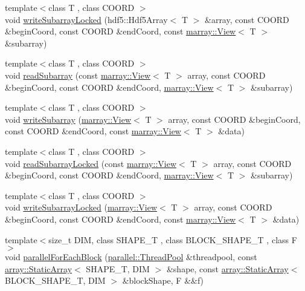 \begin{DoxyCompactItemize}
\item 
{\footnotesize template$<$class T , class C\+O\+O\+RD $>$ }\\void \hyperlink{namespacenifty_1_1tools_a102fca55b5880c5b398205f0b438fbfe}{write\+Subarray\+Locked} (hdf5\+::\+Hdf5\+Array$<$ T $>$ \&array, const C\+O\+O\+RD \&begin\+Coord, const C\+O\+O\+RD \&end\+Coord, const \hyperlink{classandres_1_1View}{marray\+::\+View}$<$ T $>$ \&subarray)
\item 
{\footnotesize template$<$class T , class C\+O\+O\+RD $>$ }\\void \hyperlink{namespacenifty_1_1tools_ab1a49786aa1d421ff8801c6659ada142}{read\+Subarray} (const \hyperlink{classandres_1_1View}{marray\+::\+View}$<$ T $>$ array, const C\+O\+O\+RD \&begin\+Coord, const C\+O\+O\+RD \&end\+Coord, \hyperlink{classandres_1_1View}{marray\+::\+View}$<$ T $>$ \&subarray)
\item 
{\footnotesize template$<$class T , class C\+O\+O\+RD $>$ }\\void \hyperlink{namespacenifty_1_1tools_ace36c8be6273f83864c4b1b261eb25d3}{write\+Subarray} (\hyperlink{classandres_1_1View}{marray\+::\+View}$<$ T $>$ array, const C\+O\+O\+RD \&begin\+Coord, const C\+O\+O\+RD \&end\+Coord, const \hyperlink{classandres_1_1View}{marray\+::\+View}$<$ T $>$ \&data)
\item 
{\footnotesize template$<$class T , class C\+O\+O\+RD $>$ }\\void \hyperlink{namespacenifty_1_1tools_ad9c06ed1bf5a27481583971a28bf9142}{read\+Subarray\+Locked} (const \hyperlink{classandres_1_1View}{marray\+::\+View}$<$ T $>$ array, const C\+O\+O\+RD \&begin\+Coord, const C\+O\+O\+RD \&end\+Coord, \hyperlink{classandres_1_1View}{marray\+::\+View}$<$ T $>$ \&subarray)
\item 
{\footnotesize template$<$class T , class C\+O\+O\+RD $>$ }\\void \hyperlink{namespacenifty_1_1tools_a0d4355b32819ca638b88af283797bc92}{write\+Subarray\+Locked} (\hyperlink{classandres_1_1View}{marray\+::\+View}$<$ T $>$ array, const C\+O\+O\+RD \&begin\+Coord, const C\+O\+O\+RD \&end\+Coord, const \hyperlink{classandres_1_1View}{marray\+::\+View}$<$ T $>$ \&data)
\item 
{\footnotesize template$<$size\+\_\+t D\+IM, class S\+H\+A\+P\+E\+\_\+T , class B\+L\+O\+C\+K\+\_\+\+S\+H\+A\+P\+E\+\_\+T , class F $>$ }\\void \hyperlink{namespacenifty_1_1tools_ac5e8d4b06486a3d603cdbb7314f8dd75}{parallel\+For\+Each\+Block} (\hyperlink{classnifty_1_1parallel_1_1ThreadPool}{parallel\+::\+Thread\+Pool} \&threadpool, const \hyperlink{namespacenifty_1_1array_a683f151f19c851754e0c6d55ed16a0c2}{array\+::\+Static\+Array}$<$ S\+H\+A\+P\+E\+\_\+T, D\+IM $>$ \&shape, const \hyperlink{namespacenifty_1_1array_a683f151f19c851754e0c6d55ed16a0c2}{array\+::\+Static\+Array}$<$ B\+L\+O\+C\+K\+\_\+\+S\+H\+A\+P\+E\+\_\+T, D\+IM $>$ \&block\+Shape, F \&\&f)

\end{DoxyCompactItemize}
